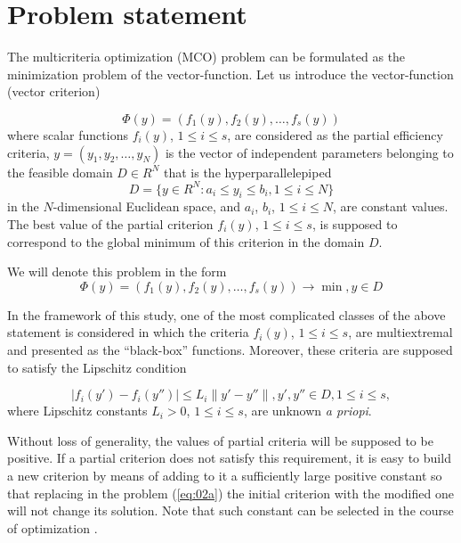 \documentclass[runningheads]{llncs}
\begin{document}
\section{Problem statement}
\label{sec:2}

The multicriteria optimization (MCO) problem can be formulated as the minimization problem of the vector-function. Let us introduce the vector-function (vector criterion)

\begin{equation}
\label{eq:01}
  \Phi(y) = (f_1 (y),f_2 (y), \dots, f_s(y))
\end{equation}
where scalar functions $f_i(y)$, $1 \leq i \leq s$, are considered as the partial efficiency criteria, $y=(y_1,y_2, \dots ,y_N)$ is the vector of independent parameters belonging to the feasible domain $D \in R^N$ that is the hyperparallelepiped
\begin{equation}
\label{eq:02}
    D=\{y \in R^N : a_i \leq y_i \leq b_i, 1 \leq i \leq N\}
\end{equation}
in the $N$-dimensional Euclidean space, and $a_i$, $b_i$, $1 \leq i \leq N$, are constant values.
The best value of the partial criterion $f_i(y)$, $1 \leq i \leq s$, is supposed to correspond to the global minimum of this criterion in the domain $D$.

We will denote this problem in the form
\begin{equation}
\label{eq:02a}
  \Phi(y) = (f_1 (y),f_2 (y), \dots, f_s(y)) \to \min, y \in D
\end{equation}

In the framework of this study, one of the most complicated classes of the above statement is considered in which the criteria $f_i(y)$, $1 \leq i \leq s$, are multiextremal and presented as the ``black-box'' functions. Moreover, these criteria are supposed to satisfy the Lipschitz condition

\begin{equation}
\label{eq:03}
|f_i (y') - f_i (y'')| \leq L_i \|y' - y''\| ,y',y'' \in D, 1 \leq i \leq s,
\end{equation}
where Lipschitz constants $L_i>0$, $1 \leq i \leq s$, are unknown \textit{a priopi}.  

Without loss of generality, the values of partial criteria will be supposed to be positive. If a partial criterion does not satisfy this requirement, it is easy to build a new criterion by means of adding to it a sufficiently large positive constant so that replacing in the problem (\ref{eq:02a}) the initial criterion with the modified one will not change its solution. Note that such constant can be selected in the course of optimization \cite{ML_MCO_2023}.
\end{document}
